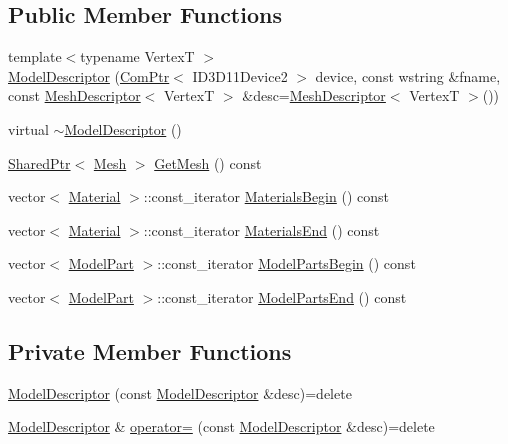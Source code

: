 \subsection*{Public Member Functions}
\begin{DoxyCompactItemize}
\item 
{\footnotesize template$<$typename VertexT $>$ }\\\hyperlink{classmage_1_1_model_descriptor_a954e69b6b83ed0f78f9c819c4604a98a}{Model\+Descriptor} (\hyperlink{namespacemage_ae74f374780900893caa5555d1031fd79}{Com\+Ptr}$<$ I\+D3\+D11\+Device2 $>$ device, const wstring \&fname, const \hyperlink{structmage_1_1_mesh_descriptor}{Mesh\+Descriptor}$<$ VertexT $>$ \&desc=\hyperlink{structmage_1_1_mesh_descriptor}{Mesh\+Descriptor}$<$ VertexT $>$())
\item 
virtual \hyperlink{classmage_1_1_model_descriptor_a3bc8ee3d1cb8d2675374727edce3d593}{$\sim$\+Model\+Descriptor} ()
\item 
\hyperlink{namespacemage_a1e01ae66713838a7a67d30e44c67703e}{Shared\+Ptr}$<$ \hyperlink{classmage_1_1_mesh}{Mesh} $>$ \hyperlink{classmage_1_1_model_descriptor_a325f0e58fda7734ace7a0e296e0d970d}{Get\+Mesh} () const
\item 
vector$<$ \hyperlink{structmage_1_1_material}{Material} $>$\+::const\+\_\+iterator \hyperlink{classmage_1_1_model_descriptor_a64a2ca531c03cd8d79eda3a728e6efa1}{Materials\+Begin} () const
\item 
vector$<$ \hyperlink{structmage_1_1_material}{Material} $>$\+::const\+\_\+iterator \hyperlink{classmage_1_1_model_descriptor_a3e1880190d58d4d1bc308766f804047d}{Materials\+End} () const
\item 
vector$<$ \hyperlink{structmage_1_1_model_part}{Model\+Part} $>$\+::const\+\_\+iterator \hyperlink{classmage_1_1_model_descriptor_a721a81fae1d5613af8a3a037577ce454}{Model\+Parts\+Begin} () const
\item 
vector$<$ \hyperlink{structmage_1_1_model_part}{Model\+Part} $>$\+::const\+\_\+iterator \hyperlink{classmage_1_1_model_descriptor_a97f78d3e5a157020f62f5e6003deaac6}{Model\+Parts\+End} () const
\end{DoxyCompactItemize}
\subsection*{Private Member Functions}
\begin{DoxyCompactItemize}
\item 
\hyperlink{classmage_1_1_model_descriptor_af44185efc20e10ede762d29bc454c5f3}{Model\+Descriptor} (const \hyperlink{classmage_1_1_model_descriptor}{Model\+Descriptor} \&desc)=delete
\item 
\hyperlink{classmage_1_1_model_descriptor}{Model\+Descriptor} \& \hyperlink{classmage_1_1_model_descriptor_a734b17224719896921e9f6252ee88483}{operator=} (const \hyperlink{classmage_1_1_model_descriptor}{Model\+Descriptor} \&desc)=delete
\end{DoxyCompactItemize}
